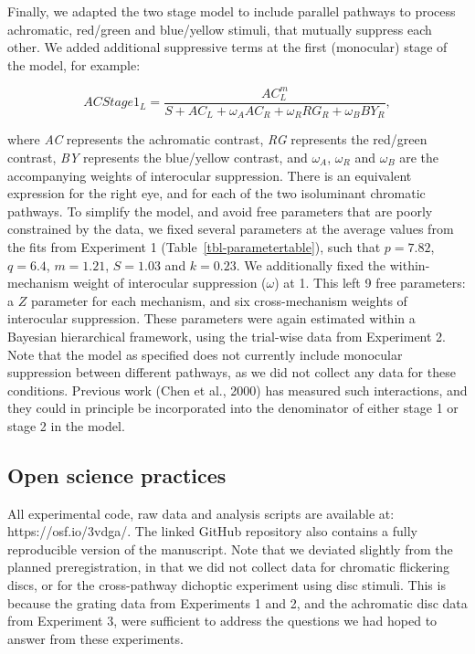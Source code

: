 \documentclass[
  letterpaper,
  DIV=11,
  numbers=noendperiod]{scrartcl}
\begin{document}
Finally, we adapted the two stage model to include parallel pathways to
process achromatic, red/green and blue/yellow stimuli, that mutually
suppress each other. We added additional suppressive terms at the first
(monocular) stage of the model, for example:

\begin{equation}
ACStage1_L = \frac{AC_L^m}{S + AC_L + \omega_A AC_R + \omega_R RG_R + \omega_B BY_R},
\end{equation}

where \emph{AC} represents the achromatic contrast, \emph{RG} represents
the red/green contrast, \emph{BY} represents the blue/yellow contrast,
and \(\omega_A\), \(\omega_R\) and \(\omega_B\) are the accompanying
weights of interocular suppression. There is an equivalent expression
for the right eye, and for each of the two isoluminant chromatic
pathways. To simplify the model, and avoid free parameters that are
poorly constrained by the data, we fixed several parameters at the
average values from the fits from Experiment 1
(Table~\ref{tbl-parametertable}), such that \(p=7.82\), \(q=6.4\),
\(m=1.21\), \(S=1.03\) and \(k=0.23\). We additionally fixed the
within-mechanism weight of interocular suppression (\(\omega\)) at 1.
This left 9 free parameters: a \(Z\) parameter for each mechanism, and
six cross-mechanism weights of interocular suppression. These parameters
were again estimated within a Bayesian hierarchical framework, using the
trial-wise data from Experiment 2. Note that the model as specified does
not currently include monocular suppression between different pathways,
as we did not collect any data for these conditions. Previous work (Chen
et al., 2000) has measured such interactions, and they could in
principle be incorporated into the denominator of either stage 1 or
stage 2 in the model.

\hypertarget{open-science-practices}{%
\subsection{Open science practices}\label{open-science-practices}}

All experimental code, raw data and analysis scripts are available at:
https://osf.io/3vdga/. The linked GitHub repository also contains a
fully reproducible version of the manuscript. Note that we deviated
slightly from the planned preregistration, in that we did not collect
data for chromatic flickering discs, or for the cross-pathway dichoptic
experiment using disc stimuli. This is because the grating data from
Experiments 1 and 2, and the achromatic disc data from Experiment 3,
were sufficient to address the questions we had hoped to answer from
these experiments.
\end{document}
